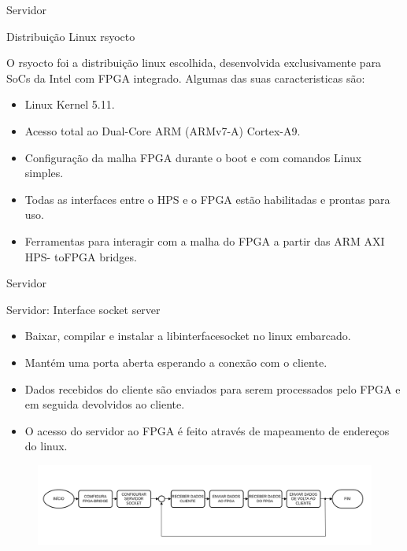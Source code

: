 \documentclass[10pt]{beamer}
\begin{document}
\begin{frame}{Servidor}
	\begin{alertblock}{Distribuição Linux rsyocto}
		\vspace{0.1cm}
		\begin{justify}
			O rsyocto foi a distribuição linux escolhida, desenvolvida exclusivamente para SoCs da Intel com FPGA integrado. Algumas das suas caracteristicas são:
		\end{justify}
		\begin{itemize}
			\item Linux Kernel 5.11.
			\item Acesso total ao Dual-Core ARM (ARMv7-A) Cortex-A9.
			\item Configuração da malha FPGA durante o boot e com comandos Linux simples.
			\item Todas as interfaces entre o HPS e o FPGA estão habilitadas e prontas para uso.
			\item Ferramentas para interagir com a malha do FPGA a partir das ARM AXI HPS-
			toFPGA bridges.
		\end{itemize}
	\end{alertblock}
\end{frame}

\begin{frame}{Servidor}
    \begin{alertblock}{Servidor: Interface socket server}
		\vspace{0.3cm}
		\begin{itemize}
			\item Baixar, compilar e instalar a libinterfacesocket no linux embarcado.
			\item Mantém uma porta aberta esperando a conexão com o cliente.
			\item Dados recebidos do cliente são enviados para serem processados pelo FPGA e em seguida devolvidos ao cliente.
			\item O acesso do servidor ao FPGA é feito através de mapeamento de endereços do
			linux.
		\end{itemize}
		\begin{figure}[h]
			\begin{center}
				\includegraphics[scale=0.28]{imagens/fluxogramaServidor.png}\\
			\end{center}
			\label{fig:servidor}
		\end{figure}
	\end{alertblock}
\end{frame}
\end{document}
